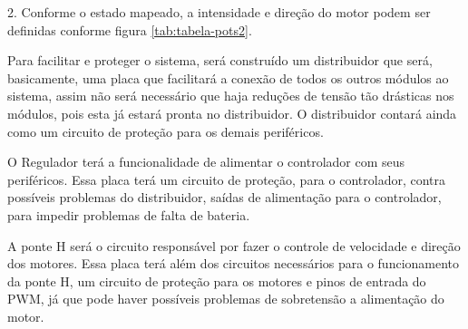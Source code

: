 2. Conforme o estado mapeado, a intensidade e direção do motor podem ser definidas conforme figura \ref{tab:tabela-pots2}.

\begin{table}[!ht]
\centering
{}
\caption{Intesidade e direção dos motores conforme estado. Asteriscos simbolizam motor sem direção}
\label{tab:tabela-pots2}
\end{table}

Para facilitar e proteger o sistema, será construído um distribuidor que será, basicamente, uma placa que facilitará a conexão de todos os outros módulos ao sistema, assim não será necessário que haja reduções de tensão tão drásticas nos módulos, pois esta já estará pronta no distribuidor. O distribuidor contará ainda como um circuito de proteção para os demais periféricos.

O Regulador terá a funcionalidade de alimentar o controlador com seus periféricos. Essa placa terá um circuito de proteção, para o controlador, contra possíveis problemas do distribuidor, saídas de alimentação para o controlador, para impedir problemas de falta de bateria.

A ponte H será o circuito responsável por fazer o controle de velocidade e direção dos motores. Essa placa terá além dos circuitos necessários para o funcionamento da ponte H, um circuito de proteção para os motores e pinos de entrada do PWM, já que pode haver possíveis problemas de sobretensão a alimentação do motor.
